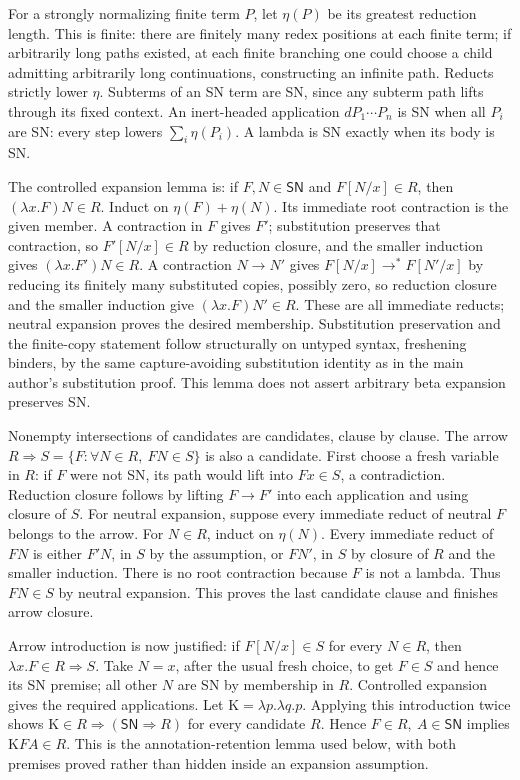 For a strongly normalizing finite term \(P\), let \(\eta(P)\) be its
greatest reduction length. This is finite: there are finitely many redex
positions at each finite term; if arbitrarily long paths existed, at
each finite branching one could choose a child admitting arbitrarily
long continuations, constructing an infinite path. Reducts strictly
lower \(\eta\). Subterms of an SN term are SN, since any subterm path
lifts through its fixed context. An inert-headed application
\(dP_1\cdots P_n\) is SN when all \(P_i\) are SN: every step lowers
\(\sum_i\eta(P_i)\). A lambda is SN exactly when its body is SN.

The controlled expansion lemma is: if \(F,N\in\mathsf{SN}\) and
\(F[N/x]\in R\), then \((\lambda x.F)N\in R\).
Induct on \(\eta(F)+\eta(N)\). Its immediate root contraction is
the given member. A contraction in \(F\) gives \(F'\); substitution
preserves that contraction, so \(F'[N/x]\in R\) by reduction closure,
and the smaller induction gives \((\lambda x.F')N\in R\).
A contraction \(N\to N'\) gives
\(F[N/x]\to^*F[N'/x]\) by reducing its finitely many substituted
copies, possibly zero, so reduction closure and the smaller induction
give \((\lambda x.F)N'\in R\). These are all immediate reducts;
neutral expansion proves the desired membership. Substitution preservation
and the finite-copy statement follow structurally on untyped syntax,
freshening binders, by the same capture-avoiding substitution identity
as in the main author's substitution proof. This lemma does not assert
arbitrary beta expansion preserves SN.

Nonempty intersections of candidates are candidates, clause by clause.
The arrow
\(R\Rightarrow S=\{F:\forall N\in R,\ FN\in S\}\)
is also a candidate. First choose a fresh variable in \(R\): if
\(F\) were not SN, its path would lift into \(Fx\in S\), a
contradiction. Reduction closure follows by lifting \(F\to F'\)
into each application and using closure of \(S\). For neutral
expansion, suppose every immediate reduct of neutral \(F\) belongs
to the arrow. For \(N\in R\), induct on \(\eta(N)\).
Every immediate reduct of \(FN\) is either \(F'N\), in \(S\)
by the assumption, or \(FN'\), in \(S\) by closure of \(R\) and
the smaller induction. There is no root contraction because \(F\)
is not a lambda. Thus \(FN\in S\) by neutral expansion. This proves
the last candidate clause and finishes arrow closure.

Arrow introduction is now justified: if \(F[N/x]\in S\) for every
\(N\in R\), then \(\lambda x.F\in R\Rightarrow S\).
Take \(N=x\), after the usual fresh choice, to get \(F\in S\)
and hence its SN premise; all other \(N\) are SN by membership in
\(R\). Controlled expansion gives the required applications.
Let \(\mathrm K=\lambda p.\lambda q.p\). Applying this introduction
twice shows \(\mathrm K\in R\Rightarrow(\mathsf{SN}\Rightarrow R)\)
for every candidate \(R\). Hence
\(F\in R,\ A\in\mathsf{SN}\) implies \(\mathrm KFA\in R\).
This is the annotation-retention lemma used below, with both premises
proved rather than hidden inside an expansion assumption.


